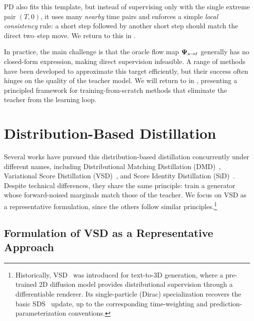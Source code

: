 PD also fits this template, but instead of supervising only with the single extreme pair $(T,0)$, it uses many \emph{nearby} time pairs and enforces a simple \emph{local consistency} rule:
a short step followed by another short step should match the direct two–step move. We return to this in .

In practice, the main challenge is that the oracle flow map ${\bm{\Psi}}_{s\to t}$ generally has no closed-form expression, making direct supervision infeasible.  A range of methods have been developed to approximate this
target efficiently, but their success often hinges on the quality of the teacher
model. We will return to  in , presenting a principled framework for training-from-scratch methods that eliminate the teacher from the learning loop.








\clearpage
\newpage



\section{\texorpdfstring{Distribution-Based Distillation}{Distribution-Based Distillation}}\label{sec:VSD}


Several works have pursued this distribution-based distillation concurrently under different names,
including Distributional Matching Distillation (DMD)~\citep{yin2024one,yin2024improved},
Variational Score Distillation (VSD)~\citep{pooledreamfusion,wang2023prolificdreamer,luo2023diff,lu2024simplifying},
and Score Identity Distillation (SiD)~\citep{zhou2024score}.
Despite technical differences, they share the same principle:
train a generator whose forward-noised marginals match those of the teacher.
We focus on VSD as a representative formulation, since the others follow similar principles.\footnote{
Historically, VSD~\citep{wang2023prolificdreamer} was introduced for text-to-3D generation, where a pre-trained 2D diffusion model provides distributional supervision through a differentiable renderer. Its single-particle (Dirac) specialization recovers the basic SDS~\citep{pooledreamfusion} update, up to the corresponding time-weighting and prediction-parameterization conventions.
}


\subsection{Formulation of VSD as a Representative Approach}
